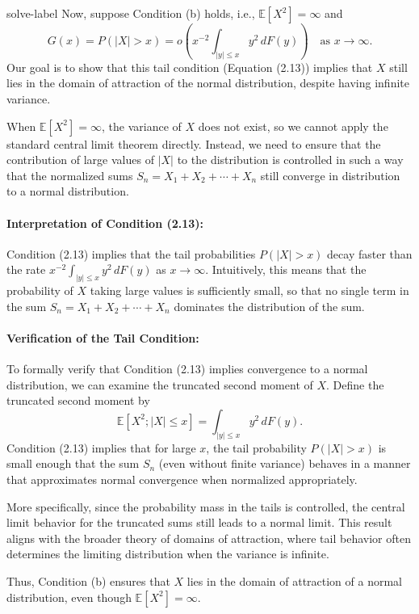 \begin{solve}{}{solve-label}
Now, suppose Condition (b) holds, i.e., \( \mathbb{E}[X^2] = \infty \) and
\[
G(x) = P(|X| > x) = o \left( x^{-2} \int_{|y| \leq x} y^2 \, dF(y) \right) \quad \text{as } x \to \infty.
\]
Our goal is to show that this tail condition (Equation (2.13)) implies that \( X \) still lies in the domain of attraction of the normal distribution, despite having infinite variance.

When \( \mathbb{E}[X^2] = \infty \), the variance of \( X \) does not exist, so we cannot apply the standard central limit theorem directly. Instead, we need to ensure that the contribution of large values of \( |X| \) to the distribution is controlled in such a way that the normalized sums \( S_n = X_1 + X_2 + \cdots + X_n \) still converge in distribution to a normal distribution.

\paragraph{Interpretation of Condition (2.13):}
Condition (2.13) implies that the tail probabilities \( P(|X| > x) \) decay faster than the rate \( x^{-2} \int_{|y| \leq x} y^2 \, dF(y) \) as \( x \to \infty \). Intuitively, this means that the probability of \( X \) taking large values is sufficiently small, so that no single term in the sum \( S_n = X_1 + X_2 + \cdots + X_n \) dominates the distribution of the sum.

\paragraph{Verification of the Tail Condition:}
To formally verify that Condition (2.13) implies convergence to a normal distribution, we can examine the truncated second moment of \( X \). Define the truncated second moment by
\[
\mathbb{E}[X^2; |X| \leq x] = \int_{|y| \leq x} y^2 \, dF(y).
\]
Condition (2.13) implies that for large \( x \), the tail probability \( P(|X| > x) \) is small enough that the sum \( S_n \) (even without finite variance) behaves in a manner that approximates normal convergence when normalized appropriately.

More specifically, since the probability mass in the tails is controlled, the central limit behavior for the truncated sums still leads to a normal limit. This result aligns with the broader theory of domains of attraction, where tail behavior often determines the limiting distribution when the variance is infinite.

Thus, Condition (b) ensures that \( X \) lies in the domain of attraction of a normal distribution, even though \( \mathbb{E}[X^2] = \infty \).


 \cite{r1,r2,r3,r4,r5,r6,r7,r8}
	\end{solve}
	
	
	
	
	
